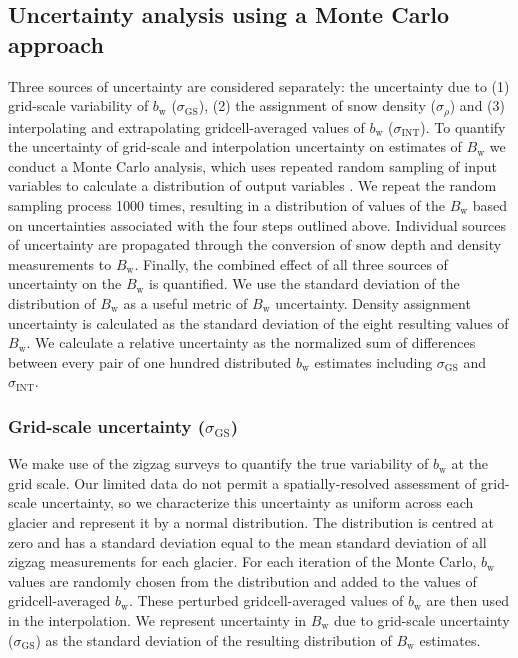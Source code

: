 \documentclass[twocolumn, letterpaper]{igs}
\begin{document}
\subsection{Uncertainty analysis using a Monte Carlo approach}

Three sources of uncertainty are considered separately: the uncertainty due to (1) grid-scale variability of $b_\mathrm{w}$ ($\sigma_{\mathrm{GS}}$), (2) the assignment of snow density ($\sigma_{\rho}$) and (3) interpolating and extrapolating gridcell-averaged values of $b_\mathrm{w}$ ($\sigma_{\mathrm{INT}}$). To quantify the uncertainty of grid-scale and interpolation uncertainty on estimates of $B_\mathrm{w}$ we conduct a Monte Carlo analysis, which uses repeated random sampling of input variables to calculate a distribution of output variables \citep{Metropolis1949}. We repeat the random sampling process 1000 times, resulting in a distribution of values of the $B_\mathrm{w}$ based on uncertainties associated with the four steps outlined above. 
Individual sources of uncertainty are propagated through the conversion of snow depth and density measurements to $B_\mathrm{w}$. Finally, the combined effect of all three sources of uncertainty on the $B_\mathrm{w}$ is quantified. We use the standard deviation of the distribution of $B_\mathrm{w}$ as a useful metric of $B_\mathrm{w}$ uncertainty. Density assignment uncertainty is calculated as the standard deviation of the eight resulting values of $B_\mathrm{w}$. We calculate a relative uncertainty as the normalized sum of differences between every pair of one hundred distributed $b_\mathrm{w}$ estimates including $\sigma_{\mathrm{GS}}$ and $\sigma_{\mathrm{INT}}$.

	\subsubsection{Grid-scale uncertainty ($\sigma_{\mathrm{GS}}$)}
We make use of the zigzag surveys to quantify the true variability of $b_\mathrm{w}$ at the grid scale. Our limited data do not permit a spatially-resolved assessment of grid-scale uncertainty, so we characterize this uncertainty as uniform across each glacier and represent it by a normal distribution. The distribution is centred at zero and has a standard deviation equal to the mean standard deviation of all zigzag measurements for each glacier. For each iteration of the Monte Carlo, $b_\mathrm{w}$ values are randomly chosen from the distribution and added to the values of gridcell-averaged $b_\mathrm{w}$. These perturbed gridcell-averaged values of $b_\mathrm{w}$ are then used in the interpolation. We represent uncertainty in $B_\mathrm{w}$ due to grid-scale uncertainty ($\sigma_{\mathrm{GS}}$) as the standard deviation of the resulting distribution of $B_\mathrm{w}$ estimates.  
\end{document}
